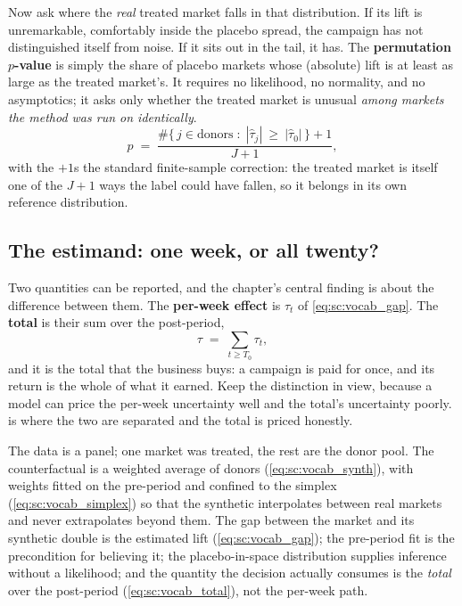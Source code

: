 Now ask where the \emph{real} treated market falls in that distribution. If its lift is
unremarkable, comfortably inside the placebo spread, the campaign has not distinguished
itself from noise. If it sits out in the tail, it has. The \textbf{permutation $p$-value} is simply the
share of placebo markets whose (absolute) lift is at least as large as the treated market's. It
requires no likelihood, no normality, and no asymptotics; it asks only whether the treated market
is unusual \emph{among markets the method was run on identically}.
%
\begin{equation}
  p \;=\; \frac{\#\big\{\, j \in \text{donors} \;:\; |\hat\tau_j| \ \ge\ |\hat\tau_0| \,\big\} + 1}
               {J + 1},
  \label{eq:sc:vocab_perm}
\end{equation}
%
with the $+1$s the standard finite-sample correction: the treated market is itself one of the
$J + 1$ ways the label could have fallen, so it belongs in its own reference distribution.



\subsection*{The estimand: one week, or all twenty?}

Two quantities can be reported, and the chapter's central finding is about the difference between
them. The \textbf{per-week effect} is $\tau_t$ of \cref{eq:sc:vocab_gap}. The \textbf{total} is
their sum over the post-period,
%
\begin{equation}
  \tau \;=\; \sum_{t \ge T_0} \tau_t ,
  \label{eq:sc:vocab_total}
\end{equation}
%
and it is the total that the business buys: a campaign is paid for once, and its return is the
whole of what it earned. Keep the distinction in view, because a model can price the per-week
uncertainty well and the total's uncertainty poorly.  is where the two are
separated and the total is priced honestly.

\begin{recap}
The data is a panel; one market was treated, the rest are the donor pool. The counterfactual is a
weighted average of donors (\cref{eq:sc:vocab_synth}), with weights fitted on the pre-period and
confined to the simplex (\cref{eq:sc:vocab_simplex}) so that the synthetic interpolates between
real markets and never extrapolates beyond them. The gap between the market and its synthetic
double is the estimated lift (\cref{eq:sc:vocab_gap}); the pre-period fit is the precondition for
believing it; the placebo-in-space distribution supplies inference without a likelihood; and the
quantity the decision actually consumes is the \emph{total} over the post-period
(\cref{eq:sc:vocab_total}), not the per-week path.
\end{recap}

